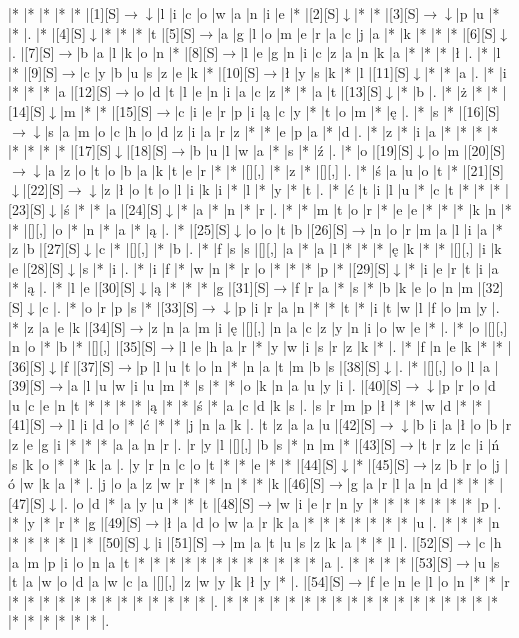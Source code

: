 \documentclass[11pt]{article}
\newcommand\drarr{$\rightarrow \!\!\!\!\! \downarrow$}
\newcommand\rarr{$\rightarrow$}
\newcommand\darr{$\downarrow$}
\begin{document}
\noindent\begin{Puzzle}{23}{33}|*	|*	|*	|*	|*	|[1][S]\drarr	|l	|i	|c	|o	|w	|a	|n	|i	|e	|*	|[2][S]\darr	|*	|*	|[3][S]\drarr	|p	|u	|*	|*	|.
|*	|[4][S]\darr	|*	|*	|*	|t	|[5][S]\rarr	|a	|g	|l	|o	|m	|e	|r	|a	|c	|j	|a	|*	|k	|*	|*	|*	|[6][S]\darr	|.
|[7][S]\rarr	|b	|a	|l	|k	|o	|n	|*	|[8][S]\rarr	|l	|e	|g	|n	|i	|c	|z	|a	|n	|k	|a	|*	|*	|*	|ł	|.
|*	|l	|*	|[9][S]\rarr	|c	|y	|b	|u	|s	|z	|e	|k	|*	|[10][S]\rarr	|ł	|y	|s	|k	|*	|l	|[11][S]\darr	|*	|*	|a	|.
|*	|i	|*	|*	|*	|a	|[12][S]\rarr	|o	|d	|t	|l	|e	|n	|i	|a	|c	|z	|*	|*	|a	|t	|[13][S]\darr	|*	|b	|.
|*	|ż	|*	|*	|[14][S]\darr	|m	|*	|*	|[15][S]\rarr	|c	|i	|e	|r	|p	|i	|ą	|c	|y	|*	|t	|o	|m	|*	|ę	|.
|*	|s	|*	|[16][S]\drarr	|s	|a	|m	|o	|c	|h	|o	|d	|z	|i	|a	|r	|z	|*	|*	|e	|p	|a	|*	|d	|.
|*	|z	|*	|i	|a	|*	|*	|*	|*	|*	|*	|*	|*	|[17][S]\darr	|[18][S]\rarr	|b	|u	|l	|w	|a	|*	|s	|*	|ź	|.
|*	|o	|[19][S]\darr	|o	|m	|[20][S]\drarr	|a	|z	|o	|t	|o	|b	|a	|k	|t	|e	|r	|*	|*	|[][,]{ }	|*	|z	|*	|[][,]{ }	|.
|*	|ś	|a	|u	|o	|t	|*	|[21][S]\darr	|[22][S]\drarr	|z	|ł	|o	|t	|o	|l	|i	|k	|i	|*	|l	|*	|y	|*	|t	|.
|*	|ć	|t	|i	|l	|u	|*	|c	|t	|*	|*	|*	|[23][S]\darr	|ś	|*	|*	|a	|[24][S]\darr	|*	|a	|*	|n	|*	|r	|.
|*	|*	|m	|t	|o	|r	|*	|e	|e	|*	|*	|*	|k	|n	|*	|*	|[][,]{ }	|o	|*	|n	|*	|a	|*	|ą	|.
|*	|[25][S]\darr	|o	|o	|t	|b	|[26][S]\rarr	|n	|o	|r	|m	|a	|l	|i	|a	|*	|z	|b	|[27][S]\darr	|c	|*	|[][,]{ }	|*	|b	|.
|*	|f	|s	|s	|[][,]{ }	|a	|*	|a	|l	|*	|*	|*	|ę	|k	|*	|*	|[][,]{ }	|i	|k	|e	|[28][S]\darr	|s	|*	|i	|.
|*	|i	|f	|*	|w	|n	|*	|r	|o	|*	|*	|*	|p	|*	|[29][S]\darr	|*	|i	|e	|r	|t	|i	|a	|*	|ą	|.
|*	|l	|e	|[30][S]\darr	|ą	|*	|*	|*	|g	|[31][S]\rarr	|f	|r	|a	|*	|s	|*	|b	|k	|e	|o	|n	|m	|[32][S]\darr	|c	|.
|*	|o	|r	|p	|s	|*	|[33][S]\drarr	|p	|i	|r	|a	|n	|*	|*	|t	|*	|i	|t	|w	|l	|f	|o	|m	|y	|.
|*	|z	|a	|e	|k	|[34][S]\rarr	|z	|n	|a	|m	|i	|ę	|[][,]{ }	|n	|a	|c	|z	|y	|n	|i	|o	|w	|e	|*	|.
|*	|o	|[][,]{ }	|n	|o	|*	|b	|*	|[][,]{ }	|[35][S]\rarr	|l	|e	|h	|a	|r	|*	|y	|w	|i	|s	|r	|z	|k	|*	|.
|*	|f	|n	|e	|k	|*	|*	|[36][S]\darr	|f	|[37][S]\rarr	|p	|l	|u	|t	|o	|n	|*	|n	|a	|t	|m	|b	|s	|[38][S]\darr	|.
|*	|[][,]{ }	|o	|l	|a	|[39][S]\rarr	|a	|l	|u	|w	|i	|u	|m	|*	|s	|*	|*	|o	|k	|n	|a	|u	|y	|i	|.
|[40][S]\drarr	|p	|r	|o	|d	|u	|c	|e	|n	|t	|*	|*	|*	|*	|ą	|*	|*	|ś	|*	|a	|c	|d	|k	|s	|.
|s	|r	|m	|p	|ł	|*	|*	|w	|d	|*	|*	|[41][S]\rarr	|l	|i	|d	|o	|*	|ć	|*	|*	|j	|n	|a	|k	|.
|t	|z	|a	|a	|u	|[42][S]\drarr	|b	|i	|a	|ł	|o	|b	|r	|z	|e	|g	|i	|*	|*	|*	|a	|a	|n	|r	|.
|r	|y	|l	|[][,]{ }	|b	|s	|*	|n	|m	|*	|[43][S]\rarr	|t	|r	|z	|c	|i	|ń	|s	|k	|o	|*	|*	|k	|a	|.
|y	|r	|n	|c	|o	|t	|*	|*	|e	|*	|*	|[44][S]\darr	|*	|[45][S]\rarr	|z	|b	|r	|o	|j	|ó	|w	|k	|a	|*	|.
|j	|o	|a	|z	|w	|r	|*	|*	|n	|*	|*	|k	|[46][S]\rarr	|g	|a	|r	|l	|a	|n	|d	|*	|*	|*	|[47][S]\darr	|.
|o	|d	|*	|a	|y	|u	|*	|*	|t	|[48][S]\rarr	|w	|i	|e	|r	|n	|y	|*	|*	|*	|*	|*	|*	|*	|p	|.
|*	|y	|*	|r	|*	|g	|[49][S]\rarr	|ł	|a	|d	|o	|w	|a	|r	|k	|a	|*	|*	|*	|*	|*	|*	|*	|u	|.
|*	|*	|*	|n	|*	|*	|*	|*	|l	|*	|[50][S]\darr	|i	|[51][S]\rarr	|m	|a	|t	|u	|s	|z	|k	|a	|*	|*	|l	|.
|[52][S]\rarr	|c	|h	|a	|m	|p	|i	|o	|n	|a	|t	|*	|*	|*	|*	|*	|*	|*	|*	|*	|*	|*	|*	|a	|.
|*	|*	|*	|*	|[53][S]\rarr	|u	|s	|t	|a	|w	|o	|d	|a	|w	|c	|a	|[][,]{ }	|z	|w	|y	|k	|ł	|y	|*	|.
|[54][S]\rarr	|f	|e	|n	|e	|l	|o	|n	|*	|*	|r	|*	|*	|*	|*	|*	|*	|*	|*	|*	|*	|*	|*	|*	|.
|*	|*	|*	|*	|*	|*	|*	|*	|*	|*	|*	|*	|*	|*	|*	|*	|*	|*	|*	|*	|*	|*	|*	|*	|.\end{Puzzle}
\end{document}

